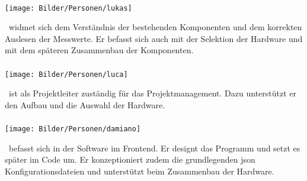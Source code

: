 \paragraph{\fenkart}
\begin{minipage}{0.37\textwidth}
	\centering
	\texttt{[image: Bilder/Personen/lukas]}
\end{minipage}
\hfill
\begin{minipage}{0.6\textwidth}
    \fenkart \ widmet sich dem Verständnis der bestehenden Komponenten und dem korrekten Auslesen der Messwerte. Er befasst sich auch mit der Selektion der Hardware und mit dem späteren Zusammenbau der Komponenten.
\end{minipage}%
\vspace{1ex}

\paragraph{\mangeng}
\begin{minipage}{0.37\textwidth}
	\centering
	\texttt{[image: Bilder/Personen/luca]}
\end{minipage}
\hfill
\begin{minipage}{0.6\textwidth}
     \mangeng \ ist als Projektleiter zuständig für das Projektmanagement. Dazu unterstützt er den Aufbau und die Auswahl der Hardware.
\end{minipage}%
\vspace{1ex}

\paragraph{\pezze}
\begin{minipage}{0.37\textwidth}
	\centering
	\texttt{[image: Bilder/Personen/damiano]}
\end{minipage}
\hfill
\begin{minipage}{0.6\textwidth}
    \pezze \ befasst sich in der Software im Frontend. Er designt das Programm und setzt es später im Code um. Er konzeptioniert zudem die grundlegenden \acs{json} Konfigurationsdateien und unterstützt beim Zusammenbau der Hardware. 
\end{minipage}%
\vspace{1ex}

